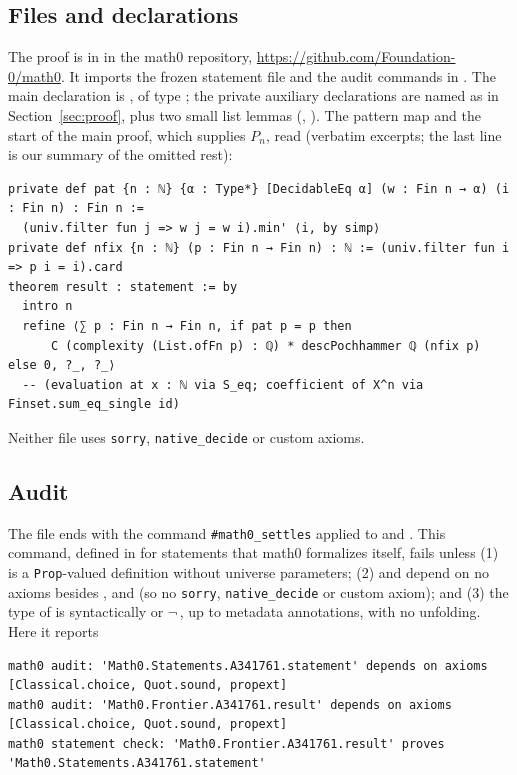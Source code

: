 \documentclass[11pt]{amsart}
\theoremstyle{plain}
\theoremstyle{definition}
\begin{document}
\subsection*{Files and declarations}
The proof is in  in the math0 repository, \url{https://github.com/Foundation-0/math0}. It imports the frozen statement file  and the audit commands in . The main declaration is , of type ; the private auxiliary declarations are named as in Section~\ref{sec:proof}, plus two small list lemmas (, ). The pattern map and the start of the main proof, which supplies $P_n$, read (verbatim excerpts; the last line is our summary of the omitted rest):
\begin{lstlisting}
private def pat {n : ℕ} {α : Type*} [DecidableEq α] (w : Fin n → α) (i : Fin n) : Fin n :=
  (univ.filter fun j => w j = w i).min' ⟨i, by simp⟩
private def nfix {n : ℕ} (p : Fin n → Fin n) : ℕ := (univ.filter fun i => p i = i).card
theorem result : statement := by
  intro n
  refine ⟨∑ p : Fin n → Fin n, if pat p = p then
      C (complexity (List.ofFn p) : ℚ) * descPochhammer ℚ (nfix p) else 0, ?_, ?_⟩
  -- (evaluation at x : ℕ via S_eq; coefficient of X^n via Finset.sum_eq_single id)
\end{lstlisting}
Neither file uses \texttt{sorry}, \texttt{native\_decide} or custom axioms.

\subsection*{Audit}
The file ends with the command \texttt{\#math0\_settles} applied to  and . This command, defined in  for statements that math0 formalizes itself, fails unless (1)  is a \texttt{Prop}-valued definition without universe parameters; (2)  and  depend on no axioms besides ,  and  (so no \texttt{sorry}, \texttt{native\_decide} or custom axiom); and (3) the type of  is syntactically  or $\neg$\,, up to metadata annotations, with no unfolding. Here it reports
\begin{lstlisting}[basicstyle=\ttfamily\scriptsize]
math0 audit: 'Math0.Statements.A341761.statement' depends on axioms [Classical.choice, Quot.sound, propext]
math0 audit: 'Math0.Frontier.A341761.result' depends on axioms [Classical.choice, Quot.sound, propext]
math0 statement check: 'Math0.Frontier.A341761.result' proves 'Math0.Statements.A341761.statement'
\end{lstlisting}
\end{document}
